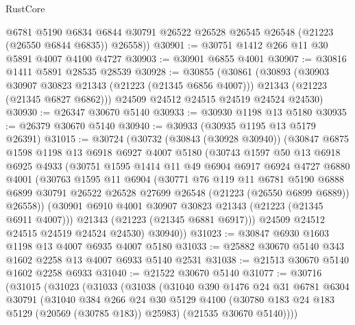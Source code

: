 \begin{lexlean}{RustCore}
\begin{coremodule}
        @6781
        @5190
        @6834
        @6844
        @30791
        @26522
        @26528
        @26545
        @26548
        (@21223 (@26550 @6844 @6835))
        @26558))
@30901 := @30751 @1412 @266 @11 @30 @5891 @4007 @4100 @4727
@30903 := @30901 @6855 @4001
@30907 := @30816 @1411 @5891 @28535 @28539
@30928 := @30855
    (@30861
      (@30893
        (@30903 @30907 @30823 @21343 (@21223 (@21345 @6856 @4007)))
        @21343
        (@21223 (@21345 @6827 @6862)))
      @24509
      @24512
      @24515
      @24519
      @24524
      @24530)
@30930 := @26347 @30670 @5140
@30933 := @30930 @1198 @13 @5180
@30935 := @26379 @30670 @5140
@30940 := @30933 (@30935 @1195 @13 @5179 @26391)
@31015 := @30724
    (@30732
      (@30843 (@30928 @30940))
      (@30847
        @6875
        @1598
        @1198
        @13
        @6918
        @6927
        @4007
        @5180
        (@30743
          @1597
          @50
          @13
          @6918
          @6925
          @4933
          (@30751
            @1595
            @1414
            @11
            @49
            @6904
            @6917
            @6924
            @4727
            @6880
            @4001
            (@30763
              @1595
              @11
              @6904
              (@30771
                @76
                @119
                @11
                @6781
                @5190
                @6888
                @6899
                @30791
                @26522
                @26528
                @27699
                @26548
                (@21223 (@26550 @6899 @6889))
                @26558))
            (@30901 @6910 @4001 @30907 @30823 @21343 (@21223 (@21345 @6911 @4007)))
            @21343
            (@21223 (@21345 @6881 @6917)))
          @24509
          @24512
          @24515
          @24519
          @24524
          @24530)
        @30940))
@31023 := @30847 @6930 @1603 @1198 @13 @4007 @6935 @4007 @5180
@31033 := @25882 @30670 @5140 @343 @1602 @2258 @13 @4007 @6933 @5140 @2531
@31038 := @21513 @30670 @5140 @1602 @2258 @6933
@31040 := @21522 @30670 @5140
@31077 := @30716
    (@31015
      (@31023
        (@31033
          (@31038
            (@31040
              @390
              @1476
              @24
              @31
              @6781
              @6304
              @30791
              (@31040
                @384
                @266
                @24
                @30
                @5129
                @4100
                (@30780 @183 @24 @183 @5129 (@20569 (@30785 @183)) @25983)
                (@21535 @30670 @5140))))

\end{coremodule}
\end{lexlean}
